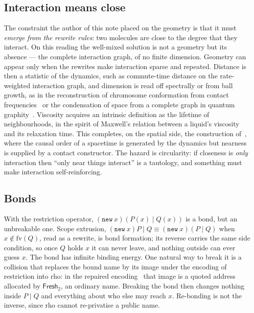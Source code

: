 \documentclass[11pt,a4paper]{article}
\theoremstyle{plain}
\theoremstyle{definition}
\theoremstyle{remark}
\newcommand{\rhoc}{\textsf{rho}}
\newcommand{\scong}{\equiv}
\newcommand{\Frsh}{\mathsf{Fresh}_2}
\newcommand{\code}[1]{\texttt{#1}}
\newcommand{\fv}{\mathrm{fv}}
\begin{document}
\subsection{Interaction means close}

The constraint the author of this note placed on the geometry is that it must
\emph{emerge from the rewrite rules}: two molecules are close to the degree
that they interact. On this reading the well-mixed solution is not a geometry
but its absence --- the complete interaction graph, of no finite dimension.
Geometry can appear only when the rewrites make interaction sparse and
repeated. Distance is then a statistic of the dynamics, such as commute-time
distance on the rate-weighted interaction graph, and dimension is read off
spectrally or from ball growth, as in the reconstruction of chromosome
conformation from contact frequencies~\cite{HiC} or the condensation of space
from a complete graph in quantum graphity~\cite{Graphity}. Viscosity acquires
an intrinsic definition as the lifetime of neighbourhoods, in the spirit of
Maxwell's relation between a liquid's viscosity and its relaxation time. This
completes, on the spatial side, the construction of~\cite{Spacetime}, where
the causal order of a spacetime is generated by the dynamics but nearness is
supplied by a contact constructor. The hazard is circularity: if closeness is
\emph{only} interaction then ``only near things interact'' is a tautology, and
something must make interaction self-reinforcing.

\subsection{Bonds}

With the restriction operator, $(\code{new}\ x)(P(x)\mid Q(x))$ is a bond, but an
unbreakable one. Scope extrusion, $(\code{new}\ x)P \mid Q \scong
(\code{new}\ x)(P\mid Q)$ when $x\notin\fv(Q)$, read as a rewrite, is bond
formation; its reverse carries the same side condition, so once $Q$ holds $x$
it can never leave, and nothing outside can ever guess $x$. The bond has
infinite binding energy. One natural way to break it is a collision that
replaces the bound name by its image under the encoding of restriction into
\rhoc{}: in the repaired encoding~\cite{NNS} that image is a quoted address
allocated by $\Frsh$, an ordinary name. Breaking the bond then changes nothing
inside $P\mid Q$ and everything about who else may reach $x$. Re-bonding is not
the inverse, since \rhoc{} cannot re-privatise a public name.
\end{document}
